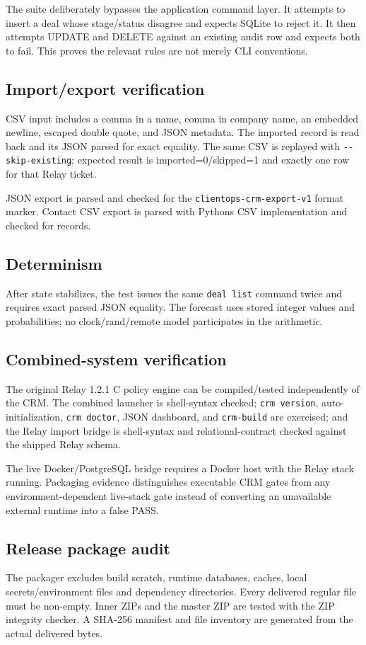 \documentclass[
]{article}
\begin{document}
The suite deliberately bypasses the application command layer. It
attempts to insert a deal whose stage/status disagree and expects SQLite
to reject it. It then attempts UPDATE and DELETE against an existing
audit row and expects both to fail. This proves the relevant rules are
not merely CLI conventions.

\subsection{Import/export verification}\label{importexport-verification}

CSV input includes a comma in a name, comma in company name, an embedded
newline, escaped double quote, and JSON metadata. The imported record is
read back and its JSON parsed for exact equality. The same CSV is
replayed with \texttt{-\/-skip-existing}; expected result is
imported=0/skipped=1 and exactly one row for that Relay ticket.

JSON export is parsed and checked for the
\texttt{clientops-crm-export-v1} format marker. Contact CSV export is
parsed with Python\textquotesingle s CSV implementation and checked for
records.

\subsection{Determinism}\label{determinism}

After state stabilizes, the test issues the same \texttt{deal\ list}
command twice and requires exact parsed JSON equality. The forecast uses
stored integer values and probabilities; no clock/rand/remote model
participates in the arithmetic.

\subsection{Combined-system
verification}\label{combined-system-verification}

The original Relay 1.2.1 C policy engine can be compiled/tested
independently of the CRM. The combined launcher is shell-syntax checked;
\texttt{crm\ version}, auto-initialization, \texttt{crm\ doctor}, JSON
dashboard, and \texttt{crm-build} are exercised; and the Relay import
bridge is shell-syntax and relational-contract checked against the
shipped Relay schema.

The live Docker/PostgreSQL bridge requires a Docker host with the Relay
stack running. Packaging evidence distinguishes executable CRM gates
from any environment-dependent live-stack gate instead of converting an
unavailable external runtime into a false PASS.

\subsection{Release package audit}\label{release-package-audit}

The packager excludes build scratch, runtime databases, caches, local
secrets/environment files and dependency directories. Every delivered
regular file must be non-empty. Inner ZIPs and the master ZIP are tested
with the ZIP integrity checker. A SHA-256 manifest and file inventory
are generated from the actual delivered bytes.
\end{document}
